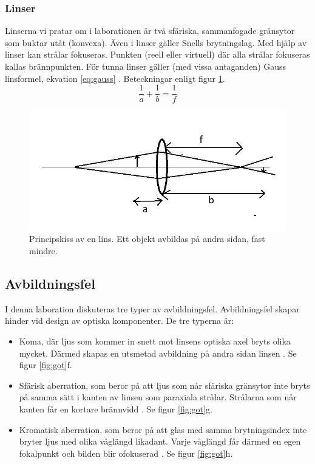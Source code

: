 \documentclass[a4paper]{article}
\begin{document}
\subsubsection{Linser}
Linserna vi pratar om i laborationen är två sfäriska, sammanfogade gränsytor som buktar utåt (konvexa). Även i linser gäller 
Snells brytningslag. Med hjälp av linser kan strålar fokuseras. Punkten (reell eller virtuell) där alla strålar fokuseras
kallas brännpunkten. För tunna linser gäller (med vissa antaganden) Gauss linsformel, ekvation \ref{eq:gauss} \cite[p.230]{vl}. Beteckningar enligt
figur \ref{fig:lens}.
\begin{equation}
    \frac{1}{a} + \frac{1}{b} = \frac{1}{f}
    \label{eq:gauss}
\end{equation}
\begin{figure}[h!]
    \includegraphics[height=0.3\textheight]{lens.png}
    \caption{Principskiss av en lins. Ett objekt avbildas på andra sidan, fast mindre.}
    \label{fig:lens}
\end{figure}
\subsection{Avbildningsfel}
I denna laboration diskuteras tre typer av avbildningsfel. Avbildningsfel skapar hinder vid design av optiska komponenter.
De tre typerna är:
\begin{itemize}
    \item Koma, där ljus som kommer in snett mot linsens optiska axel bryts olika mycket. Därmed skapas en utsmetad
    avbildning på andra sidan linsen \cite{ins}. Se figur \ref{fig:got}f.
    \item Sfärisk aberration, som beror på att ljus som når sfäriska gränsytor inte bryts på samma sätt i kanten av linsen som paraxiala strålar.
    Strålarna som når kanten får en kortare brännvidd \cite[p.238]{vl}. Se figur \ref{fig:got}g.
    \item Kromatisk aberration, som beror på att glas med samma brytningsindex inte bryter ljus med olika våglängd
    likadant. Varje våglängd får därmed en egen fokalpunkt och bilden blir ofokuserad  \cite[p.237]{vl}. Se figur \ref{fig:got}h.
\end{itemize}
\end{document}
